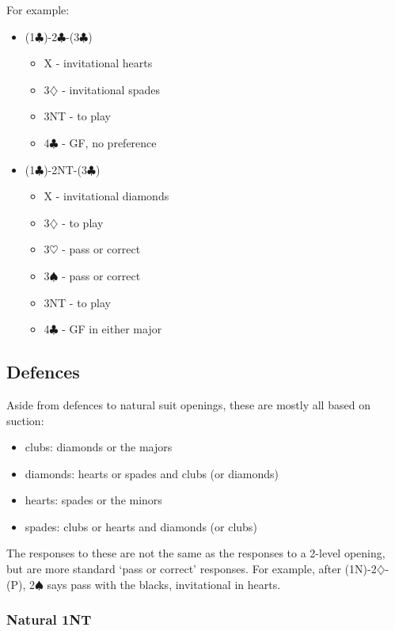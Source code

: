 \documentclass[a4paper,14pt]{extarticle}
\begin{document}
\newpage

For example:

\begin{itemize}
\item (1$\clubsuit$)-2$\clubsuit$-(3$\clubsuit$)
	\begin{itemize}
	\item X - invitational hearts
	\item 3$\diamondsuit$ - invitational spades
	\item 3NT - to play
	\item 4$\clubsuit$ - GF, no preference
	\end{itemize}
\item (1$\clubsuit$)-2NT-(3$\clubsuit$)
	\begin{itemize}
	\item X - invitational diamonds
	\item 3$\diamondsuit$ - to play
	\item 3$\heartsuit$ - pass or correct
	\item 3$\spadesuit$ - pass or correct
	\item 3NT - to play
	\item 4$\clubsuit$ - GF in either major
	\end{itemize}
\end{itemize}

\newpage

\subsection{Defences}
\label{sec:defences}

Aside from defences to natural suit openings, these are mostly all based on suction:

\begin{itemize}
\item clubs: diamonds or the majors
\item diamonds: hearts or spades and clubs (or diamonds)
\item hearts: spades or the minors
\item spades: clubs or hearts and diamonds (or clubs)
\end{itemize}

The responses to these are not the same as the responses to a 2-level opening,
but are more standard `pass or correct' responses. For example, after
(1N)-2$\diamondsuit$-(P), 2$\spadesuit$ says pass with the blacks, invitational
in hearts.

\subsubsection{Natural 1NT}
\label{sec:def:1n}
\end{document}
